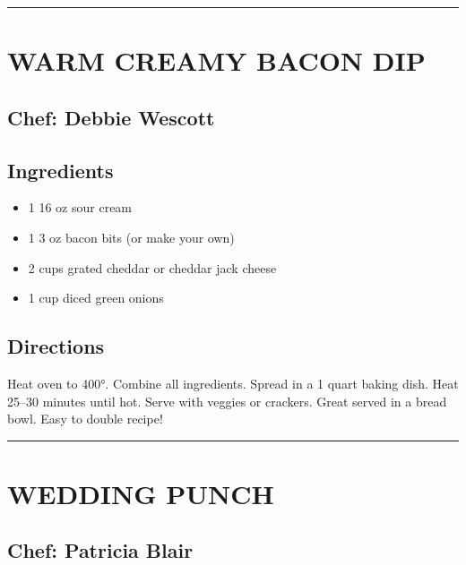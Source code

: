 \documentclass[
]{book}
\providecommand{\tightlist}{%
  \setlength{\itemsep}{0pt}\setlength{\parskip}{0pt}}
\begin{document}
\begin{center}\rule{0.5\linewidth}{0.5pt}\end{center}

\hypertarget{warm-creamy-bacon-dip}{%
\section*{WARM CREAMY BACON DIP}\label{warm-creamy-bacon-dip}}


\hypertarget{chef-debbie-wescott-1}{%
\subsection*{Chef: Debbie Wescott}\label{chef-debbie-wescott-1}}


\hypertarget{ingredients-11}{%
\subsection*{Ingredients}\label{ingredients-11}}


\begin{itemize}
\tightlist
\item
  1 16 oz sour cream
\item
  1 3 oz bacon bits (or make your own)
\item
  2 cups grated cheddar or cheddar jack cheese
\item
  1 cup diced green onions
\end{itemize}

\hypertarget{directions-11}{%
\subsection*{Directions}\label{directions-11}}


Heat oven to 400°. Combine all ingredients. Spread in a 1 quart baking dish. Heat 25--30 minutes until hot. Serve with veggies or crackers. Great served in a bread bowl. Easy to double recipe!

\begin{center}\rule{0.5\linewidth}{0.5pt}\end{center}

\hypertarget{wedding-punch}{%
\section*{WEDDING PUNCH}\label{wedding-punch}}


\hypertarget{chef-patricia-blair-4}{%
\subsection*{Chef: Patricia Blair}\label{chef-patricia-blair-4}}
\end{document}
